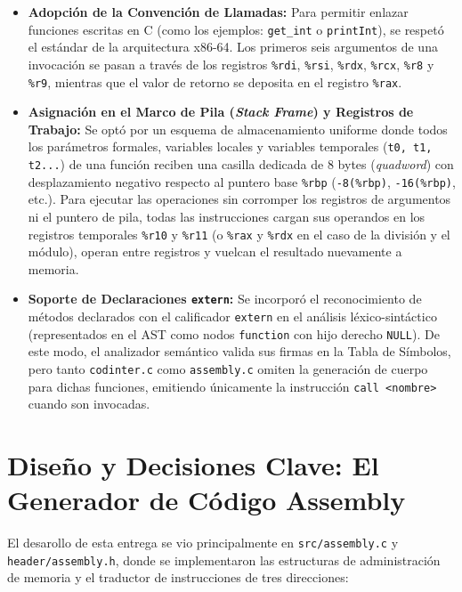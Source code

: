 \documentclass[12pt, a4paper]{article}
\begin{document}
\begin{itemize}
    \item \textbf{Adopción de la Convención de Llamadas:} Para permitir enlazar funciones escritas en C (como los ejemplos: \texttt{get\_int} o \texttt{printInt}), se respetó el estándar de la arquitectura x86-64. Los primeros seis argumentos de una invocación se pasan a través de los registros \texttt{\%rdi}, \texttt{\%rsi}, \texttt{\%rdx}, \texttt{\%rcx}, \texttt{\%r8} y \texttt{\%r9}, mientras que el valor de retorno se deposita en el registro \texttt{\%rax}.
    \item \textbf{Asignación en el Marco de Pila (\textit{Stack Frame}) y Registros de Trabajo:} Se optó por un esquema de almacenamiento uniforme donde todos los parámetros formales, variables locales y variables temporales (\texttt{t0, t1, t2...}) de una función reciben una casilla dedicada de 8 bytes (\textit{quadword}) con desplazamiento negativo respecto al puntero base \texttt{\%rbp} (\texttt{-8(\%rbp)}, \texttt{-16(\%rbp)}, etc.). Para ejecutar las operaciones sin corromper los registros de argumentos ni el puntero de pila, todas las instrucciones cargan sus operandos en los registros temporales \texttt{\%r10} y \texttt{\%r11} (o \texttt{\%rax} y \texttt{\%rdx} en el caso de la división y el módulo), operan entre registros y vuelcan el resultado nuevamente a memoria.
    \item \textbf{Soporte de Declaraciones \texttt{extern}:} Se incorporó el reconocimiento de métodos declarados con el calificador \texttt{extern} en el análisis léxico-sintáctico (representados en el AST como nodos \texttt{function} con hijo derecho \texttt{NULL}). De este modo, el analizador semántico valida sus firmas en la Tabla de Símbolos, pero tanto \texttt{codinter.c} como \texttt{assembly.c} omiten la generación de cuerpo para dichas funciones, emitiendo únicamente la instrucción \texttt{call <nombre>} cuando son invocadas.
\end{itemize}

\section{Diseño y Decisiones Clave: El Generador de Código Assembly}
El desarollo de esta entrega se vio principalmente en \texttt{src/assembly.c} y \texttt{header/assembly.h}, donde se implementaron las estructuras de administración de memoria y el traductor de instrucciones de tres direcciones:
\end{document}
